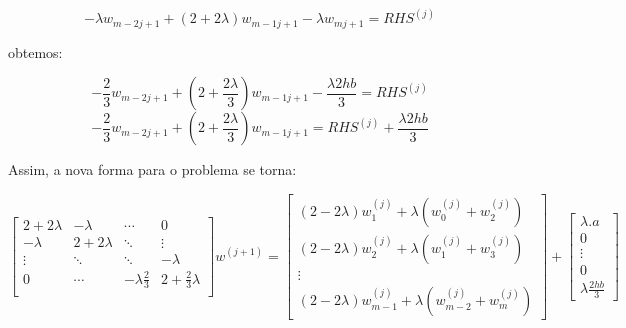 \documentclass[11pt]{article}
\begin{document}
	$$-\lambda w_{m-2j+1} + (2+2\lambda)w_{m-1j+1} - \lambda w_{mj+1} = RHS^{(j)} $$
	
obtemos:

	$$ -\frac{2}{3}w_{m-2j+1} + (2+\frac{2\lambda}{3})w_{m-1j+1} - \frac{\lambda2hb}{3} = RHS^{(j)}$$
	$$ -\frac{2}{3}w_{m-2j+1} + (2+\frac{2\lambda}{3})w_{m-1j+1} = RHS^{(j)} + \frac{\lambda2hb}{3} $$
	
Assim, a nova forma para o problema se torna:

	\begin{equation}
	\begin{bmatrix}
	2+2\lambda & -\lambda & \cdots & 0 \\
	-\lambda & 2+2\lambda & \ddots & \vdots\\
	\vdots & \ddots & \ddots & -\lambda\\
	0 & \cdots & -\lambda\frac{2}{3} & 2+\frac{2}{3}\lambda\\
	\end{bmatrix}w^{(j+1)} = 
	\begin{bmatrix}
	(2-2\lambda)w_1^{(j)} + \lambda(w_{0}^{(j)} + w_2^{(j)})\\
	(2-2\lambda)w_2^{(j)} + \lambda(w_{1}^{(j)} + w_3^{(j)})\\
	\vdots\\
	(2-2\lambda)w_{m-1}^{(j)} + \lambda(w_{m-2}^{(j)} + w_m^{(j)})
	\end{bmatrix} + 
	\begin{bmatrix}
	\lambda.a\\
	0\\
	\vdots\\
	0\\
	\lambda\frac{2hb}{3}
	\end{bmatrix}
	\end{equation}
\end{document}
